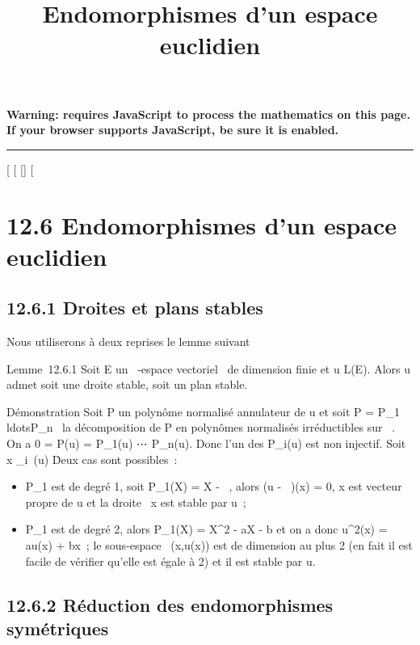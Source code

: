 \documentclass[]{article}
\title{Endomorphismes d'un espace euclidien}
\author{}
\date{}
\begin{document}
\maketitle

\textbf{Warning: 
requires JavaScript to process the mathematics on this page.\\ If your
browser supports JavaScript, be sure it is enabled.}

\begin{center}\rule{3in}{0.4pt}\end{center}

[
[
[]
[

\section{12.6 Endomorphismes d'un espace euclidien}

\subsection{12.6.1 Droites et plans stables}

Nous utiliserons à deux reprises le lemme suivant

Lemme~12.6.1 Soit E un ~-espace vectoriel ~de dimension finie et u \in
L(E). Alors u admet soit une droite stable, soit un plan stable.

Démonstration Soit P un polynôme normalisé annulateur de u et soit P =
P_1\\ldotsP_n~
la décomposition de P en polynômes normalisés irréductibles sur ~. On a
0 = P(u) = P_1(u) \cdot⋯ \cdot
P_n(u). Donc l'un des P_i(u) est non injectif. Soit x
\in\mathrmKerP_i~(u)
\diagdown\0\. Deux cas sont possibles~:

\begin{itemize}
\itemsep1pt\parskip0pt
\item
  P_1 est de degré 1, soit P_1(X) = X - \lambda~, alors (u -
  \lambda~\mathrmId)(x) = 0, x est vecteur propre de u et la
  droite ~x est stable par u~;
\item
  P_1 est de degré 2, alors P_1(X) = X^2 -
  aX - b et on a donc u^2(x) = au(x) + bx~; le sous-espace
  \mathrmVect~(x,u(x)) est
  de dimension au plus 2 (en fait il est facile de vérifier qu'elle est
  égale à 2) et il est stable par u.
\end{itemize}

\subsection{12.6.2 Réduction des endomorphismes symétriques}
\end{document}
